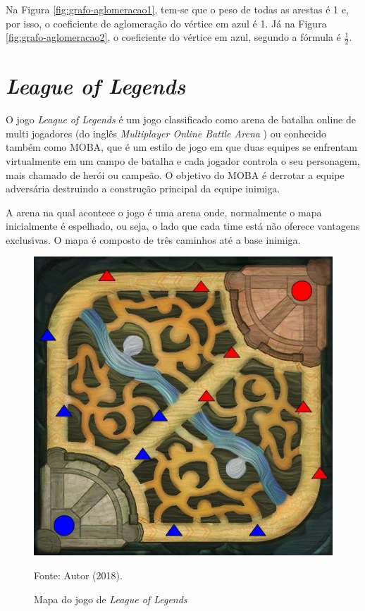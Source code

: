 Na Figura \ref{fig:grafo-aglomeracao1}, tem-se que o peso de todas as arestas é 1 e, por isso, o coeficiente de aglomeração
do vértice em azul é 1.  Já na Figura \ref{fig:grafo-aglomeracao2}, o coeficiente do vértice em azul, segundo a fórmula é $\frac{1}{2}$. 
    


\section{\textit{League of Legends}}
\label{chap:lol}
O jogo \textit{League of Legends} é um jogo classificado como arena de batalha online de multi jogadores (do inglês \textit{Multiplayer Online Battle Arena} ) ou conhecido também como MOBA, que é um estilo de jogo em que duas equipes se enfrentam virtualmente em um campo de batalha e cada jogador controla o seu personagem, mais chamado de herói ou campeão. O objetivo do MOBA é derrotar a equipe adversária destruindo a construção principal da equipe inimiga.

A arena na qual acontece o jogo é uma arena onde, normalmente o mapa inicialmente é  espelhado,  ou  seja, o lado que cada time está não  oferece vantagens  exclusivas.  O mapa é composto  de  três caminhos até a base inimiga.
    

\begin{figure}[H]
	\caption{Mapa do jogo de \textit{League of Legends}}
	\begin{center}
		\includegraphics{imagens/mapa_lol.jpg}
	\end{center}
	\small{Fonte: Autor (2018).}
	\label{fig:mapa_lol}
\end{figure}

